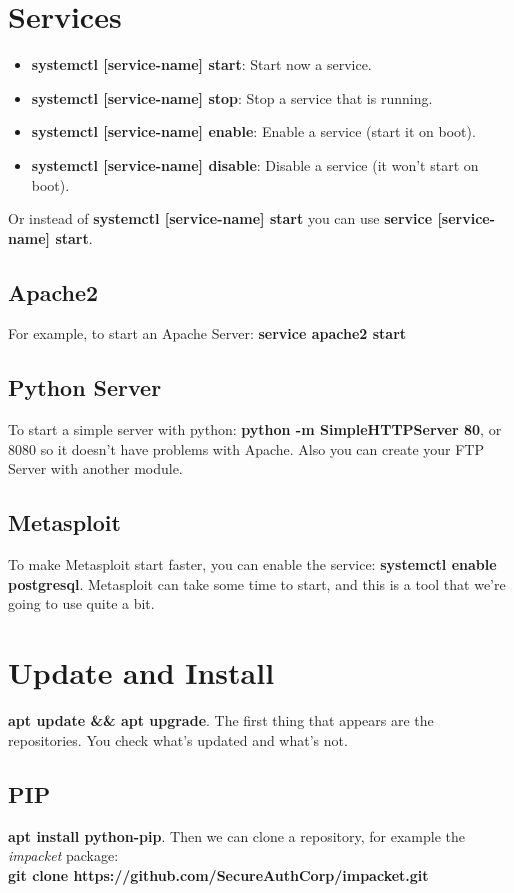 \documentclass[11pt,a4paper]{article}
\begin{document}
\section{Services}
\begin{itemize}
\item \textbf{systemctl [service-name] start}: Start now a service.
\item \textbf{systemctl [service-name] stop}: Stop a service that is running.
\item \textbf{systemctl [service-name] enable}: Enable a service (start it on boot).
\item \textbf{systemctl [service-name] disable}: Disable a service (it won't start on boot).
\end{itemize}

Or instead of \textbf{systemctl [service-name] start} you can use \textbf{service [service-name] start}.
\subsection{Apache2}
For example, to start an Apache Server: \textbf{service apache2 start}

\subsection{Python Server}
To start a simple server with python: \textbf{python -m SimpleHTTPServer 80}, or 8080 so it doesn't have problems with Apache. Also you can create your FTP Server with another module.

\subsection{Metasploit}
To make Metasploit start faster, you can enable the service: \textbf{systemctl enable postgresql}. Metasploit can take some time to start, and this is a tool that we're going to use quite a bit.

\section{Update and Install}
\textbf{apt update \&\& apt upgrade}. The first thing that appears are the repositories. You check what's updated and what's not.

\subsection{PIP}
\textbf{apt install python-pip}. Then we can clone a repository, for example the \textit{impacket} package: \\
\textbf{git clone https://github.com/SecureAuthCorp/impacket.git}\\
\end{document}
